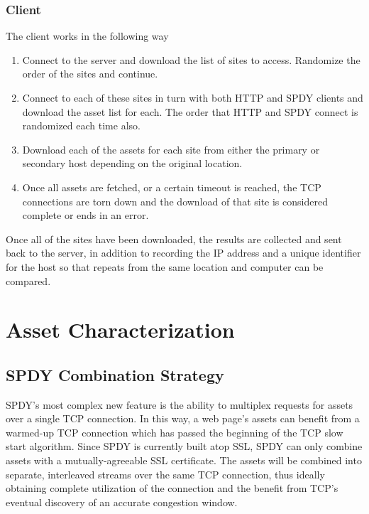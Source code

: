 \documentclass[10pt,letterpaper,notitlepage]{article}
\begin{document}
\subsubsection{Client}
\label{sec:research/client}
The client works in the following way
\begin{enumerate}
    \item Connect to the server and download the list of sites to access.
        Randomize the order of the sites and continue.
    \item Connect to each of these sites in turn with both HTTP and SPDY clients
        and download the asset list for each.  The order that HTTP and SPDY
        connect is randomized each time also.
    \item Download each of the assets for each site from either the primary or
        secondary host depending on the original location.
    \item Once all assets are fetched, or a certain timeout is reached, the TCP
        connections are torn down and the download of that site is considered
        complete or ends in an error.
\end{enumerate}
Once all of the sites have been downloaded, the results are collected and sent
back to the server, in addition to recording the IP address and a unique
identifier for the host so that repeats from the same location and computer can
be compared.

\section{Asset Characterization}
\label{sec:assets}
\subsection{SPDY Combination Strategy}
SPDY's most complex new feature is the ability to multiplex requests for assets
over a single TCP connection. In this way, a web page's assets can benefit from
a warmed-up TCP connection which has passed the beginning of the TCP slow start
algorithm. Since SPDY is currently built atop SSL, SPDY can only combine assets
with a mutually-agreeable SSL certificate. The assets will be combined into
separate, interleaved streams over the same TCP connection, thus ideally
obtaining complete utilization of the connection and the benefit from TCP's
eventual discovery of an accurate congestion window.
\end{document}
